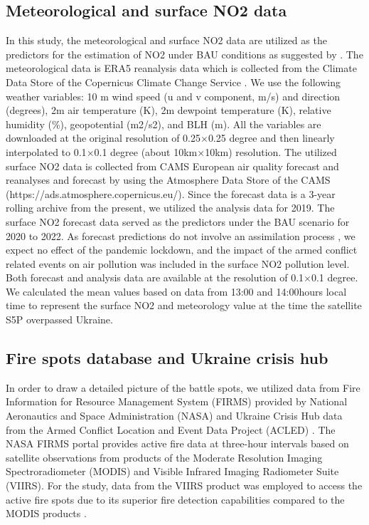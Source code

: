\subsection{Meteorological and surface NO2 data}
In this study, the meteorological and surface NO2 data are utilized as the predictors for the estimation of NO2 under BAU conditions as suggested by \citep{barre2021estimating}. The meteorological data is ERA5 reanalysis data which is collected from the Climate Data Store of the Copernicus Climate Change Service \citep{hersbach2018era5}. We use the following weather variables: 10 m wind speed  (u and v component, m/s) and direction (degrees), 2m air temperature (K), 2m dewpoint temperature (K), relative humidity (\%), geopotential (m2/s2), and BLH (m). All the variables are downloaded at the original resolution of 0.25$\times$0.25 degree and then linearly interpolated to 0.1$\times$0.1 degree (about 10km$\times$10km) resolution. The utilized surface NO2 data is collected from CAMS European air quality forecast and reanalyses and forecast \citep{marecal2015regional} by using the Atmosphere Data Store of the CAMS (https://ads.atmosphere.copernicus.eu/). Since the forecast data is a 3-year rolling archive from the present, we utilized the analysis data for 2019. The surface NO2 forecast data served as the predictors under the BAU scenario for 2020 to 2022. As forecast predictions do not involve an assimilation process \citep{barre2021estimating}, we expect no effect of the pandemic lockdown, and the impact of the armed conflict related events on air pollution was included in the surface NO2 pollution level. Both forecast and analysis data are available at the resolution of 0.1$\times$0.1 degree. We calculated the mean values based on data from 13:00 and 14:00hours local time to represent the surface NO2 and meteorology value at the time the satellite S5P overpassed Ukraine. \par
\subsection{Fire spots database and Ukraine crisis hub}
In order to draw a detailed picture of the battle spots, we utilized data from Fire Information for Resource Management System (FIRMS) provided by National Aeronautics and Space Administration (NASA) and Ukraine Crisis Hub data from the Armed Conflict Location and Event Data Project (ACLED) \citep{raleigh2010introducing}. The NASA FIRMS portal provides active fire data at three-hour intervals based on satellite observations from products of the Moderate Resolution Imaging Spectroradiometer (MODIS) and Visible Infrared Imaging Radiometer Suite (VIIRS). For the study, data from the VIIRS product was employed to access the active fire spots due to its superior fire detection capabilities compared to the MODIS products \citep{csiszar2014active,schroeder2014new}. \par

